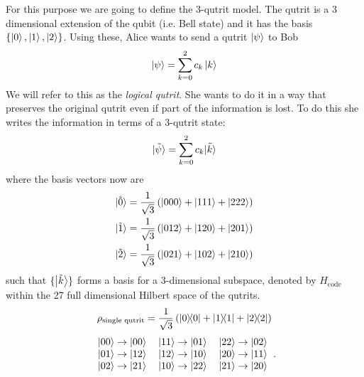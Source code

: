 \documentclass[letter,12pt]{article}
\begin{document}
For this purpose we are going to define the 3-qutrit model. The qutrit is a 3 dimensional extension of the qubit (i.e. Bell state) and it has the basis $\{\ket{0},\ket{1},\ket{2}\}$. Using these, Alice wants to send a qutrit $\ket{\psi}$ to Bob
\begin{equation}
	\begin{aligned}
		\ket{\psi}=\sum_{k=0}^{2}c_k \ket{k}
	\end{aligned}
\end{equation}
We will refer to this as the \textit{logical qutrit}. She wants to do it in a way that preserves the original qutrit even if part of the information is lost. To do this she writes the information in terms of a 3-qutrit state:
\begin{equation}
	\begin{aligned}
		|\tilde \psi\rangle=\sum_{k=0}^{2}c_k \tilde{\ket{k}}
	\end{aligned}
\end{equation}
where the basis vectors now are
	\begin{equation} \label{eq:masslessSH}
		\begin{aligned}
			|\tilde 0\rangle &=\frac{1}{\sqrt{3}}\left(\ket{000}+\ket{111}+\ket{222}\right)\\
			|\tilde 1\rangle &=\frac{1}{\sqrt{3}}\left(\ket{012}+\ket{120}+\ket{201}\right)\\
			|\tilde 2\rangle &=\frac{1}{\sqrt{3}}\left(\ket{021}+\ket{102}+\ket{210}\right)\\
		\end{aligned}
	\end{equation}
such that $\{\ket{\tilde k}\}$ forms a basis for a 3-dimensional subspace, denoted by $H_{\text{code}}$ within the 27 full dimensional Hilbert space of the qutrits.
\begin{equation}
	\begin{aligned}
		\rho_{\text{single qutrit}}=\frac{1}{\sqrt{3}}
\left(\dyad{0}{0}+\dyad{1}{1}+\dyad{2}{2}\right)	\end{aligned}
\end{equation}
\begin{align}
	\begin{tabular}{ l c r }
		$|00\rangle\to|00\rangle$ & $|11\rangle \to |01\rangle$ & $|22\rangle\to |02\rangle$ \\ 
		$|01\rangle \to |12\rangle$ & $|12\rangle \to |10\rangle$ & $|20\rangle \to |11\rangle$ \\
		$|02\rangle\to |21\rangle$ & $|10\rangle\to|22\rangle$ & $|21\rangle \to |20\rangle$ 
	\end{tabular}.
\end{align}
\end{document}
